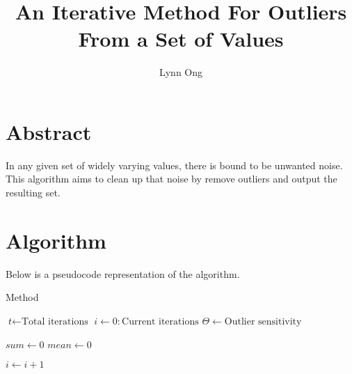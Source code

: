 \documentclass{book}
\begin{document}
\title{An Iterative Method For Outliers From a Set of Values}
\author{Lynn Ong}
\maketitle

\section{Abstract}
In any given set of widely varying values, there is bound to be unwanted noise.
This algorithm aims to clean up that noise by remove outliers and output the resulting set.

\section{Algorithm}
Below is a pseudocode representation of the algorithm.
\begin{algorithm}

\caption{Method}

\begin{algorithmic}[1]

\State $\textit{t} \gets \text{Total iterations}$
\State $\textit{i} \gets 0 : \text{Current iterations}$
\State $\Theta \gets \text{Outlier sensitivity}$

\State $\textit{sum} \gets 0$
\State $\textit{mean} \gets 0$


\State $\textit{i} \gets \textit{i} + 1$
\EndWhile

\EndProcedure

\end{algorithmic}

\end{algorithm}
\end{document}
